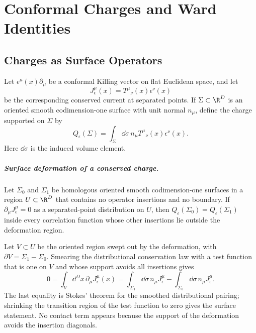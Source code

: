 \chapter{Conformal Charges and Ward Identities}
\label{ch:volume-iii-conformal-charges-ward-identities}
\ConventionsEuclideanCFT


\section{Charges as Surface Operators}

\begin{definition}
\label{def:conformal-surface-charge}
Let \(\epsilon^\mu(x)\partial_\mu\) be a conformal Killing vector on flat
Euclidean space, and let
\[
  J^\mu_\epsilon(x)=T^\mu{}_\nu(x)\epsilon^\nu(x)
\]
be the corresponding conserved current at separated points.  If
\(\Sigma\subset\R^D\) is an oriented smooth codimension-one surface with unit
normal \(n_\mu\), define the charge supported on \(\Sigma\) by
\begin{equation}
  Q_\epsilon(\Sigma)
  =
  \int_\Sigma \dd\sigma\,n_\mu T^\mu{}_\nu(x)\epsilon^\nu(x).
  \label{eq:cft-charge-surface}
\end{equation}
Here \(\dd\sigma\) is the induced volume element.
\end{definition}

\paragraph{Surface deformation of a conserved charge.}
Let \(\Sigma_0\) and \(\Sigma_1\) be homologous oriented smooth
codimension-one surfaces in a region \(U\subset\R^D\) that contains no operator
insertions and no boundary.  If
\(\partial_\mu J^\mu_\epsilon=0\) as a separated-point distribution on
\(U\), then \(Q_\epsilon(\Sigma_0)=Q_\epsilon(\Sigma_1)\) inside every
correlation function whose other insertions lie outside the deformation
region.

Let \(V\subset U\) be the oriented region swept out by the deformation, with
\(\partial V=\Sigma_1-\Sigma_0\).  Smearing the distributional conservation
law with a test function that is one on \(V\) and whose support avoids all
insertions gives
\[
  0
  =
  \int_V\dd^D x\,\partial_\mu J^\mu_\epsilon(x)
  =
  \int_{\Sigma_1}\dd\sigma\,n_\mu J^\mu_\epsilon
  -
  \int_{\Sigma_0}\dd\sigma\,n_\mu J^\mu_\epsilon .
\]
The last equality is Stokes' theorem for the smoothed distributional pairing;
shrinking the transition region of the test function to zero gives the
surface statement.  No contact term appears because the support of the
deformation avoids the insertion diagonals.

